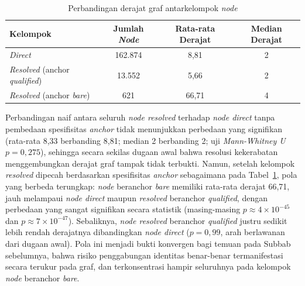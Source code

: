 \begin{table}[H]
\centering
\caption{Perbandingan derajat graf antarkelompok \textit{node}}
\label{tab:derajat-kekerabatan}
\renewcommand{\arraystretch}{1.3}
\begin{tabular}{|l|c|c|c|}
\hline
\textbf{Kelompok} & \textbf{Jumlah \textit{Node}} & \textbf{Rata-rata Derajat} & \textbf{Median Derajat} \\
\hline
\textit{Direct} & 162.874 & 8,81 & 2 \\
\hline
\textit{Resolved} (anchor \textit{qualified}) & 13.552 & 5,66 & 2 \\
\hline
\textit{Resolved} (anchor \textit{bare}) & 621 & 66,71 & 4 \\
\hline
\end{tabular}
\end{table}

Perbandingan naif antara seluruh \textit{node resolved} terhadap \textit{node direct} tanpa pembedaan spesifisitas \textit{anchor} tidak menunjukkan perbedaan yang signifikan (rata-rata 8,33 berbanding 8,81; median 2 berbanding 2; uji \textit{Mann-Whitney U} $p=0,275$), sehingga secara sekilas dugaan awal bahwa resolusi kekerabatan menggembungkan derajat graf tampak tidak terbukti. Namun, setelah kelompok \textit{resolved} dipecah berdasarkan spesifisitas \textit{anchor} sebagaimana pada Tabel~\ref{tab:derajat-kekerabatan}, pola yang berbeda terungkap: \textit{node} beranchor \textit{bare} memiliki rata-rata derajat 66,71, jauh melampaui \textit{node direct} maupun \textit{resolved} beranchor \textit{qualified}, dengan perbedaan yang sangat signifikan secara statistik (masing-masing $p\approx4\times10^{-45}$ dan $p\approx7\times10^{-47}$). Sebaliknya, \textit{node resolved} beranchor \textit{qualified} justru sedikit lebih rendah derajatnya dibandingkan \textit{node direct} ($p=0,99$, arah berlawanan dari dugaan awal). Pola ini menjadi bukti konvergen bagi temuan pada Subbab sebelumnya, bahwa risiko penggabungan identitas benar-benar termanifestasi secara terukur pada graf, dan terkonsentrasi hampir seluruhnya pada kelompok \textit{node} beranchor \textit{bare}.


